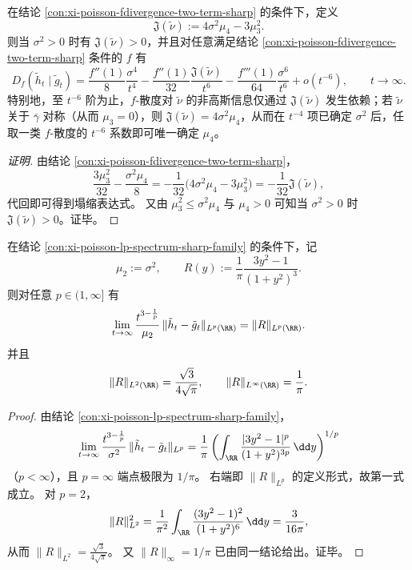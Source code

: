 \begin{conclusion}\label{con:xi-poisson-fdivergence-single-parameter-collapse}
在结论 \ref{con:xi-poisson-fdivergence-two-term-sharp} 的条件下，定义
\[
\mathfrak J(\tilde\nu):=4\sigma^2\mu_4-3\mu_3^2.
\]
则当 \(\sigma^2>0\) 时有 \(\mathfrak J(\tilde\nu)>0\)，并且对任意满足结论 \ref{con:xi-poisson-fdivergence-two-term-sharp} 条件的 \(f\) 有
\[
D_f(\tilde h_t\mid \tilde g_t)
=\frac{f''(1)}{8}\frac{\sigma^4}{t^4}
-\frac{f''(1)}{32}\frac{\mathfrak J(\tilde\nu)}{t^6}
-\frac{f'''(1)}{64}\frac{\sigma^6}{t^6}
+o(t^{-6}),
\qquad t\to\infty.
\]
特别地，至 \(t^{-6}\) 阶为止，\(f\)-散度对 \(\tilde\nu\) 的非高斯信息仅通过 \(\mathfrak J(\tilde\nu)\) 发生依赖；若 \(\tilde\nu\) 关于 \(\bar\gamma\) 对称（从而 \(\mu_3=0\)），则 \(\mathfrak J(\tilde\nu)=4\sigma^2\mu_4\)，从而在 \(t^{-4}\) 项已确定 \(\sigma^2\) 后，任取一类 \(f\)-散度的 \(t^{-6}\) 系数即可唯一确定 \(\mu_4\)。
\end{conclusion}
\begin{proof}[证明]
由结论 \ref{con:xi-poisson-fdivergence-two-term-sharp}，
\[
\frac{3\mu_3^2}{32}-\frac{\sigma^2\mu_4}{8}
=-\frac1{32}\bigl(4\sigma^2\mu_4-3\mu_3^2\bigr)
=-\frac1{32}\mathfrak J(\tilde\nu),
\]
代回即可得到塌缩表达式。
又由 \(\mu_3^2\le \sigma^2\mu_4\) 与 \(\mu_4>0\) 可知当 \(\sigma^2>0\) 时 \(\mathfrak J(\tilde\nu)>0\)。证毕。
\end{proof}

\begin{conclusion}\label{con:xi-poisson-cauchy-lp-sharp-limit-canonical-profile}
在结论 \ref{con:xi-poisson-lp-spectrum-sharp-family} 的条件下，记
\[
\mu_2:=\sigma^2,\qquad
R(y):=\frac1\pi\frac{3y^2-1}{(1+y^2)^3}.
\]
则对任意 \(p\in(1,\infty]\) 有
\[
\lim_{t\to\infty}
\frac{t^{3-\frac1p}}{\mu_2}\,
\|\tilde h_t-\tilde g_t\|_{L^p(\RR)}
=\|R\|_{L^p(\RR)}.
\]
并且
\[
\|R\|_{L^2(\RR)}=\frac{\sqrt3}{4\sqrt\pi},\qquad
\|R\|_{L^\infty(\RR)}=\frac1\pi.
\]
\end{conclusion}
\begin{proof}
由结论 \ref{con:xi-poisson-lp-spectrum-sharp-family}，
\[
\lim_{t\to\infty}
\frac{t^{3-\frac1p}}{\sigma^2}\,
\|\tilde h_t-\tilde g_t\|_{L^p}
=\frac1\pi\left(\int_{\RR}\frac{|3y^2-1|^p}{(1+y^2)^{3p}}\,\dd y\right)^{1/p}
\]
（\(p<\infty\)），且 \(p=\infty\) 端点极限为 \(1/\pi\)。
右端即 \(\|R\|_{L^p}\) 的定义形式，故第一式成立。
对 \(p=2\)，
\[
\|R\|_{L^2}^2
=\frac1{\pi^2}\int_{\RR}\frac{(3y^2-1)^2}{(1+y^2)^6}\,\dd y
=\frac{3}{16\pi},
\]
从而 \(\|R\|_{L^2}=\frac{\sqrt3}{4\sqrt\pi}\)。
又 \(\|R\|_\infty=1/\pi\) 已由同一结论给出。证毕。
\end{proof}

